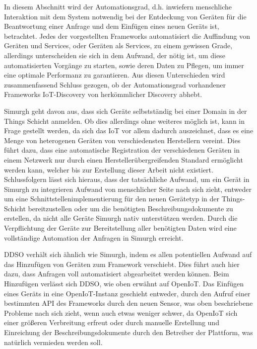 \documentclass[conference,compsoc]{IEEEtran}
\begin{document}
In diesem Abschnitt wird der Automationsgrad, d.h. inwiefern menschliche Interaktion mit dem System notwendig bei der Entdeckung von Geräten für die Beantwortung einer Anfrage und dem Einfügen eines neuen Geräts ist, betrachtet. Jedes der vorgestellten Frameworks automatisiert die Auffindung von Geräten und Services, oder Geräten als Services, zu einem gewissen Grade, allerdings unterscheiden sie sich in dem Aufwand, der nötig ist, um diese automatisierten Vorgänge zu starten, sowie deren Daten zu Pflegen, um immer eine optimale Performanz zu garantieren. Aus diesen Unterschieden wird zusammenfassend Schluss gezogen, ob der Automationsgrad vorhandener Frameworks IoT-Discovery von herkömmlicher Discovery abhebt.

Simurgh geht davon aus, dass sich Geräte selbstständig bei einer Domain in der Things Schicht anmelden. Ob dies allerdings ohne weiteres möglich ist, kann in Frage gestellt werden, da sich das IoT vor allem dadurch auszeichnet, dass es eine Menge von heterogenen Geräten von verschiedensten Herstellern vereint. Dies führt dazu, dass eine automatische Registration der verschiedenen Geräten in einem Netzwerk nur durch einen Herstellerübergreifenden Standard ermöglicht werden kann, welcher bis zur Erstellung dieser Arbeit nicht existiert. Schlussfolgern lässt sich hieraus, dass der tatsächliche Aufwand, um ein Gerät in Simurgh zu integrieren Aufwand von menschlicher Seite nach sich zieht, entweder um eine Schnittstellenimplementierung für den neuen Gerätetyp in der Things-Schicht bereitzustellen oder um die benötigten Beschreibungsdokumente zu erstellen, da nicht alle Geräte Simurgh nativ unterstützen werden. Durch die Verpflichtung der Geräte zur Bereitstellung aller benötigten Daten wird eine vollständige Automation der Anfragen in Simurgh erreicht.

DDSO verhält sich ähnlich wie Simurgh, indem es allen potentiellen Aufwand auf das Hinzufügen von Geräten zum Framework verschiebt. Dies führt auch hier dazu, dass Anfragen voll automatisiert abgearbeitet werden können. Beim Hinzufügen verlässt sich DDSO, wie oben erwähnt auf OpenIoT. Das Einfügen eines Geräts in eine OpenIoT-Instanz geschieht entweder, durch den Aufruf einer bestimmten API des Frameworks durch den neuen Sensor, was oben beschriebene Probleme nach sich zieht, wenn auch etwas weniger schwer, da OpenIoT sich einer größeren Verbreitung erfreut oder durch manuelle Erstellung und Einreichung der Beschreibungsdokumente durch den Betreiber der Plattform, was natürlich vermieden werden soll.
\end{document}
